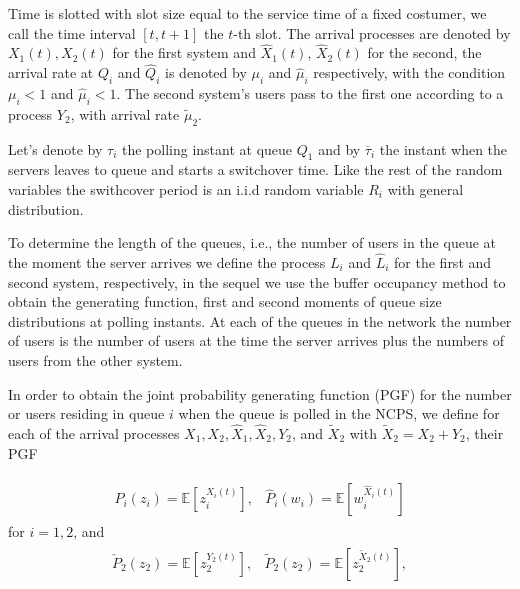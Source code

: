 \documentclass{article}
\newcommand{\esp}{\mathbb{E}}
\begin{document}
Time is slotted with slot size equal to the service time of a fixed costumer, we call the time interval $\left[t,t+1\right]$ the $t$-th slot. The arrival processes are denoted by $X_{1}\left(t\right),X_{2}\left(t\right)$ for the first system and $\hat{X}_{1}\left(t\right)$, $\hat{X}_{2}\left(t\right)$ for the second, the arrival rate at $Q_{i}$ and $\hat{Q}_{i}$ is denoted by $\mu_{i}$ and $\hat{\mu}_{i}$ respectively, with the condition $\mu_{i}<1$ and $\hat{\mu}_{i}<1$. The second system's users pass to the first one according to a process $Y_{2}$, with arrival rate $\tilde{\mu}_{2}$. 

Let's denote by $\tau_{i}$ the polling instant at queue $Q_{1}$ and by $\overline{\tau}_{i}$ the instant when the servers leaves to queue and starts a switchover time. Like the rest of the random variables the swithcover period is an i.i.d random variable $R_{i}$ with general distribution. 


To determine the length of the queues, i.e., the number of users in the queue at the moment the server arrives we define the process $L_{i}$ and $\hat{L}_{i}$ for the first and second system, respectively, in the sequel we use the buffer occupancy method to obtain the generating function, first and second moments of queue size distributions at polling instants. At each of the queues in the network the number of users is the number of users at the time the server arrives plus the numbers of users from the other system. 


In order to obtain the joint probability generating function (PGF) for the number or users residing in queue $i$ when the queue is polled in the NCPS, we define for each of the arrival processes $X_{1},X_{2},\hat{X}_{1},\hat{X}_{2},Y_{2}$, and $\tilde{X}_{2}$ with $\tilde{X}_{2}=X_{2}+Y_{2}$, their PGF

\begin{eqnarray*}
\begin{array}{cc}
P_{i}\left(z_{i}\right)=\esp\left[z_{i}^{X_{i}\left(t\right)}\right],&
\hat{P}_{i}\left(w_{i}\right)=\esp\left[w_{i}^{\hat{X}_{i}\left(t\right)}\right]
\end{array}
\end{eqnarray*}
for $i=1,2$, and
\begin{eqnarray*}
\begin{array}{cc}
\check{P}_{2}\left(z_{2}\right)=\esp\left[z_{2}^{Y_{2}\left(t\right)}\right],& \tilde{P}_{2}\left(z_{2}\right)=\esp\left[z_{2}^{\tilde{X}_{2}\left(t\right)}
\right],
\end{array}
\end{eqnarray*}
\end{document}
